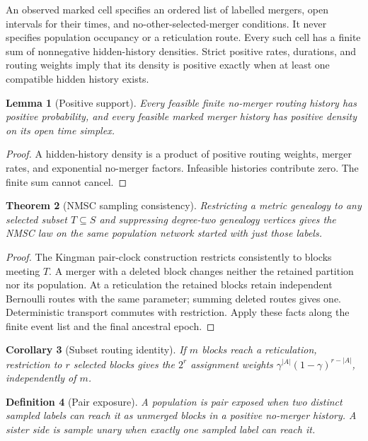 \documentclass[11pt]{article}
\newtheorem{theorem}{Theorem}[section]
\newtheorem{lemma}[theorem]{Lemma}
\newtheorem{corollary}[theorem]{Corollary}
\newtheorem{definition}[theorem]{Definition}
\begin{document}
An observed marked cell specifies an ordered list of labelled mergers, open
intervals for their times, and no-other-selected-merger conditions.  It never
specifies population occupancy or a reticulation route.  Every such cell has a
finite sum of nonnegative hidden-history densities.  Strict positive rates,
durations, and routing weights imply that its density is positive exactly
when at least one compatible hidden history exists.

\begin{lemma}[Positive support]
\label{lem:positive-support}
Every feasible finite no-merger routing history has positive probability, and
every feasible marked merger history has positive density on its open time
simplex.
\end{lemma}
\begin{proof}
A hidden-history density is a product of positive routing weights, merger
rates, and exponential no-merger factors.  Infeasible histories contribute
zero.  The finite sum cannot cancel.
\end{proof}

\begin{theorem}[NMSC sampling consistency]
\label{thm:sampling-consistency}
Restricting a metric genealogy to any selected subset $T\subseteq S$ and
suppressing degree-two genealogy vertices gives the NMSC law on the same
population network started with just those labels.
\end{theorem}
\begin{proof}
The Kingman pair-clock construction restricts consistently to blocks meeting
$T$.  A merger with a deleted block changes neither the retained partition
nor its population.  At a reticulation the retained blocks retain independent
Bernoulli routes with the same parameter; summing deleted routes gives one.
Deterministic transport commutes with restriction.  Apply these facts along
the finite event list and the final ancestral epoch.
\end{proof}

\begin{corollary}[Subset routing identity]
\label{cor:subset-routing}
If $m$ blocks reach a reticulation, restriction to $r$ selected blocks gives
the $2^r$ assignment weights
$\gamma^{|A|}(1-\gamma)^{r-|A|}$, independently of $m$.
\end{corollary}

\begin{definition}[Pair exposure]
A population is pair exposed when two distinct sampled labels can reach it
as unmerged blocks in a positive no-merger history.  A sister side is sample
unary when exactly one sampled label can reach it.
\end{definition}
\end{document}
